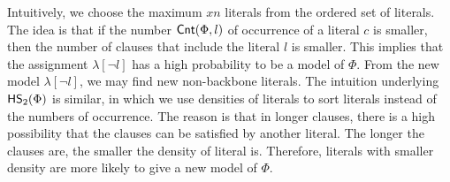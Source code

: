 Intuitively, we choose the maximum $xn$ literals from the ordered set of literals.
The idea is that if the number $\textsf{Cnt}(\Phi,l)$ of occurrence of a literal $c$ is smaller,
then the number of clauses that include the literal $l$ is smaller. This implies that the assignment $\lambda[\neg l]$ has a high probability to be a model of
$\Phi$. From the new model $\lambda[\neg l]$, we may find new non-backbone literals.
The intuition underlying ${\sf HS}_2(\Phi)$ is similar, in which we use densities of literals to sort literals instead of the numbers of occurrence.
The reason is that in longer clauses, there is a high possibility that the clauses can be satisfied by another literal. The longer the clauses are, the smaller the density of literal is. Therefore, literals with smaller density are more likely to give a new model of $\Phi$.









